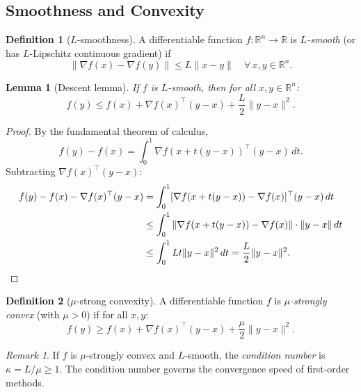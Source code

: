 \documentclass[11pt,a4paper]{article}
\theoremstyle{definition}
\newtheorem{definition}{Definition}[section]
\theoremstyle{plain}
\newtheorem{lemma}[theorem]{Lemma}
\theoremstyle{remark}
\newtheorem{remark}{Remark}[section]
\newcommand{\R}{\mathbb{R}}
\begin{document}
\subsection{Smoothness and Convexity}

\begin{definition}[$L$-smoothness]\label{def:smooth}
A differentiable function $f : \R^n \to \R$ is \emph{$L$-smooth} (or has
$L$-Lipschitz continuous gradient) if
\begin{equation}\label{eq:smooth}
  \|\nabla f(x) - \nabla f(y)\| \le L \|x - y\| \quad \forall\, x, y \in \R^n.
\end{equation}
\end{definition}

\begin{lemma}[Descent lemma]\label{lem:descent}
If $f$ is $L$-smooth, then for all $x, y \in \R^n$:
\begin{equation}\label{eq:descent-lemma}
  f(y) \le f(x) + \nabla f(x)^\top (y - x) + \frac{L}{2}\|y - x\|^2.
\end{equation}
\end{lemma}

\begin{proof}
By the fundamental theorem of calculus,
\[
  f(y) - f(x) = \int_0^1 \nabla f(x + t(y-x))^\top (y-x)\, dt.
\]
Subtracting $\nabla f(x)^\top(y-x)$:
\begin{align*}
  f(y) - f(x) - \nabla f(x)^\top(y-x)
  &= \int_0^1 [\nabla f(x + t(y-x)) - \nabla f(x)]^\top (y-x)\, dt \\
  &\le \int_0^1 \|\nabla f(x + t(y-x)) - \nabla f(x)\| \cdot \|y-x\|\, dt \\
  &\le \int_0^1 L t \|y-x\|^2\, dt = \frac{L}{2}\|y-x\|^2. \qedhere
\end{align*}
\end{proof}

\begin{definition}[$\mu$-strong convexity]\label{def:strong-convex}
A differentiable function $f$ is \emph{$\mu$-strongly convex} (with $\mu > 0$)
if for all $x, y$:
\begin{equation}\label{eq:strong-convex}
  f(y) \ge f(x) + \nabla f(x)^\top(y - x) + \frac{\mu}{2}\|y - x\|^2.
\end{equation}
\end{definition}

\begin{remark}\label{rem:condition-number}
If $f$ is $\mu$-strongly convex and $L$-smooth, the \emph{condition number} is
$\kappa = L/\mu \ge 1$. The condition number governs the convergence speed of
first-order methods.
\end{remark}
\end{document}
